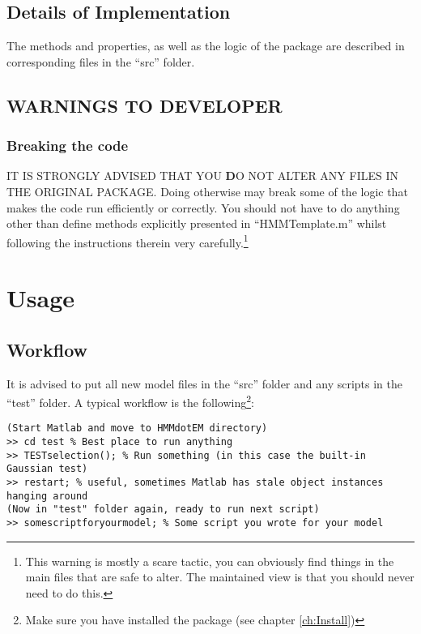\documentclass[]{scrreprt}
\begin{document}
\section{Details of Implementation}
The methods and properties, as well as the logic of the package are described in
corresponding files in the ``src'' folder.

\section{WARNINGS TO DEVELOPER}
\subsection{Breaking the code}
IT IS STRONGLY ADVISED THAT YOU {\textbf DO NOT} ALTER ANY FILES IN THE ORIGINAL
PACKAGE. Doing otherwise may break some of the logic that makes the code run
efficiently or correctly. You should not have to do anything other than define
methods explicitly presented in ``HMMTemplate.m'' whilst following the
instructions therein very carefully.\footnote{This warning is mostly a scare
tactic, you can obviously find things in the main files that are safe to alter.
The maintained view is that you should never need to do this.}

\chapter{Usage}
\section{Workflow}
It is advised to put all new model files in the ``src'' folder and any
scripts in the ``test'' folder. A typical workflow is the
following\footnote{Make sure you have installed the package (see chapter \ref{ch:Install})}:
\begin{verbatim}
(Start Matlab and move to HMMdotEM directory)
>> cd test % Best place to run anything
>> TESTselection(); % Run something (in this case the built-in Gaussian test)
>> restart; % useful, sometimes Matlab has stale object instances hanging around
(Now in "test" folder again, ready to run next script)
>> somescriptforyourmodel; % Some script you wrote for your model
\end{verbatim}
\end{document}
